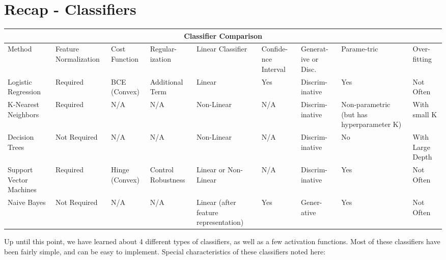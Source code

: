 \documentclass{article}
\begin{document}
\section{Recap - Classifiers}
\begin{tabular}{ |p{1.7cm}||p{1.4cm}|p{1.4cm}|p{1.4cm}|p{1.4cm}|p{1.4cm}|p{1.4cm}|p{1.4cm}|p{1.4cm}|  }
 \hline
 \multicolumn{9}{|c|}{Classifier Comparison} \\
 \hline
 Method&Feature Normalization&Cost Function&Regular-ization&Linear Classifier&Confide-nce Interval&Generat-ive or Disc.&Parame-tric&Over-fitting\\
 \hline
 Logistic Regression&Required&BCE (Convex)&Additional Term&Linear&Yes&Discrim-inative&Yes&Not \newline Often\\
 \hline
 K-Nearest Neighbors&Required&N/A&N/A&Non-Linear&N/A&Discrim-inative&Non-parametric (but has hyperparameter K)&With small K\\
 \hline
 Decision Trees&Not \newline Required&N/A&N/A&Non-Linear&N/A&Discrim-inative&No&With Large Depth\\
 \hline
 Support Vector Machines&Required&Hinge (Convex)&Control Robustness&Linear or Non-Linear&N/A&Discrim-inative&Yes&Not \newline Often\\
 \hline
 Naive Bayes&Not \newline Required&N/A&N/A&Linear (after feature representation)&Yes&Gener-ative&Yes&Not \newline Often\\
 \hline
\end{tabular}
\newline \newline
Up until this point, we have learned about 4 different types of classifiers, as well as a few activation functions. Most of these classifiers have been fairly simple, and can be easy to implement. Special characteristics of these classifiers noted here:
\end{document}
